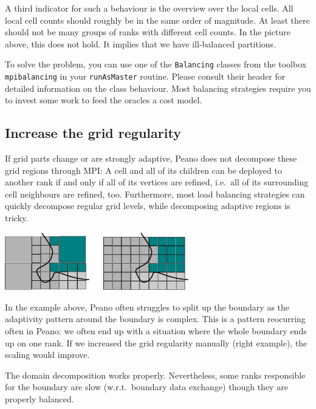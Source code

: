 A third indicator for such a behaviour is the overview over the local cells.
All local cell counts should roughly be in the same order of magnitude. 
At least there should not be many groups of ranks with different cell counts.
In the picture above, this does not hold.
It implies that we have ill-balanced partitions.

To solve the problem, you can use one of the \texttt{Balancing} classes from the
toolbox \texttt{mpibalancing} in your \texttt{runAsMaster} routine.
Please consult their header for detailed information on the class behaviour.
Most balancing strategies require you to invest some work to feed the
oracles a cost model.



\subsection{Increase the grid regularity}
\label{section:mpi:quick-tuning:grid-regularity}


If grid parts change or are strongly adaptive, Peano does not decompose these
grid regions through MPI:
A cell and all of its children can be deployed to another rank if and only if
all of its vertices are refined, i.e.~all of its surrounding cell neighbours are
refined, too.
Furthermore, most load balancing strategies can quickly decompose regular
grid levels, while decomposing adaptive regions is tricky.

\begin{center}
  \includegraphics[width=0.6\textwidth]{62_quick-tuning/regularity.pdf}
\end{center}

\noindent
In the example above, Peano often struggles to split up the boundary as the
adaptivity pattern around the boundary is complex.
This is a pattern reocurring often in Peano:
we often end up with a situation where the whole boundary ends up on one rank.
If we increased the grid regularity manually (right example), the scaling
would improve.

\begin{smell}
  The domain decomposition works properly. Nevertheless, some ranks responsible
  for the boundary are slow (w.r.t.~boundary data exchange) though they are
  properly balanced.
\end{smell}

